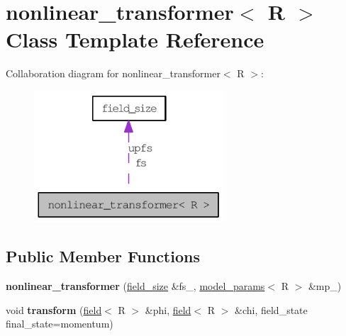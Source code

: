 \hypertarget{classnonlinear__transformer}{
\section{nonlinear\_\-transformer$<$ R $>$ Class Template Reference}
\label{classnonlinear__transformer}
}
Collaboration diagram for nonlinear\_\-transformer$<$ R $>$:\nopagebreak
\begin{figure}[H]
\begin{center}
\leavevmode
\includegraphics[width=200pt]{classnonlinear__transformer__coll__graph}
\end{center}
\end{figure}
\subsection*{Public Member Functions}
\begin{DoxyCompactItemize}
\item 
\hypertarget{classnonlinear__transformer_a5a38e3a2f6fcef5e3795f4d62ff00243}{
{\bfseries nonlinear\_\-transformer} (\hyperlink{structfield__size}{field\_\-size} \&fs\_\-, \hyperlink{structmodel__params}{model\_\-params}$<$ R $>$ \&mp\_\-)}
\label{classnonlinear__transformer_a5a38e3a2f6fcef5e3795f4d62ff00243}

\item 
\hypertarget{classnonlinear__transformer_a7f8891a31a5f12a741e044665f8bf53b}{
void {\bfseries transform} (\hyperlink{classfield}{field}$<$ R $>$ \&phi, \hyperlink{classfield}{field}$<$ R $>$ \&chi, field\_\-state final\_\-state=momentum)}
\label{classnonlinear__transformer_a7f8891a31a5f12a741e044665f8bf53b}

\end{DoxyCompactItemize}

